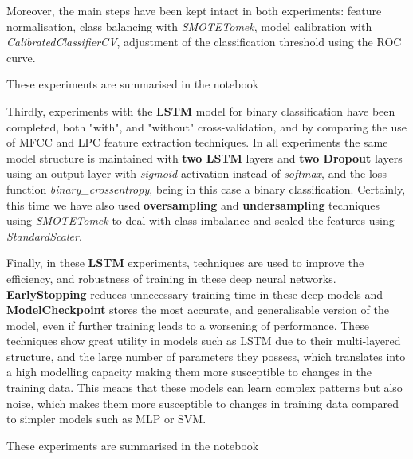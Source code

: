 Moreover, the main steps have been kept intact in both experiments: feature normalisation, class balancing with \textit{SMOTETomek}, model calibration with \textit{CalibratedClassifierCV}, adjustment of the classification threshold using the ROC curve. 

These experiments are summarised in the notebook 

Thirdly, experiments with the \textbf{LSTM} model for binary classification have been completed, both "with", and "without" cross-validation, and by comparing the use of MFCC and LPC feature extraction techniques. In all experiments the same model structure is maintained with \textbf{two LSTM} layers and \textbf{two Dropout} layers using an output layer with \textit{sigmoid} activation instead of \textit{softmax}, and the loss function \textit{binary\_crossentropy}, being in this case a binary classification. Certainly, this time we have also used \textbf{oversampling} and \textbf{undersampling} techniques using \textit{SMOTETomek} to deal with class imbalance and scaled the features using \textit{StandardScaler}. 

Finally, in these \textbf{LSTM} experiments, techniques are used to improve the efficiency, and robustness of training in these deep neural networks. \textbf{EarlyStopping} reduces unnecessary training time in these deep models and \textbf{ModelCheckpoint} stores the most accurate, and generalisable version of the model, even if further training leads to a worsening of performance. These techniques show great utility in models such as LSTM due to their multi-layered structure, and the large number of parameters they possess, which translates into a high modelling capacity making them more susceptible to changes in the training data. This means that these models can learn complex patterns but also noise, which makes them more susceptible to changes in training data compared to simpler models such as MLP or SVM.


These experiments are summarised in the notebook 


